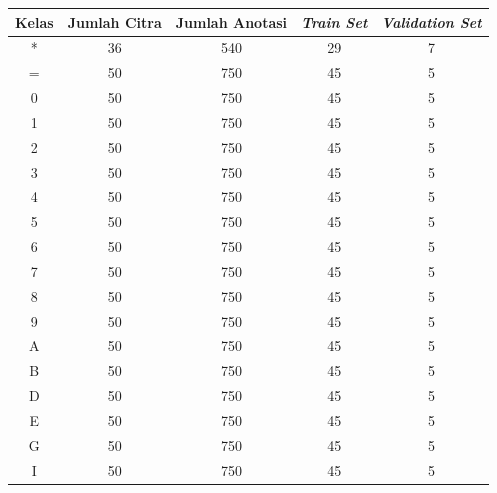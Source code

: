 \begin{center}
  \begin{longtable}[c]{|c|c|c|c|c|}
    \hline
    \textbf{Kelas} & \textbf{Jumlah Citra} & \multicolumn{1}{l|}{\textbf{Jumlah Anotasi}} & \multicolumn{1}{l|}{\textit{\textbf{Train Set}}} & \multicolumn{1}{l|}{\textit{\textbf{Validation Set}}} \\ \hline
    \endfirsthead
    \endhead
    *              & 36           & 540         & 29         & 7         \\ \hline
    =              & 50           & 750         & 45         & 5         \\ \hline
    0              & 50           & 750         & 45         & 5         \\ \hline
    1              & 50           & 750         & 45         & 5         \\ \hline
    2              & 50           & 750         & 45         & 5         \\ \hline
    3              & 50           & 750         & 45         & 5         \\ \hline
    4              & 50           & 750         & 45         & 5         \\ \hline
    5              & 50           & 750         & 45         & 5         \\ \hline
    6              & 50           & 750         & 45         & 5         \\ \hline
    7              & 50           & 750         & 45         & 5         \\ \hline
    8              & 50           & 750         & 45         & 5         \\ \hline
    9              & 50           & 750         & 45         & 5         \\ \hline
    A              & 50           & 750         & 45         & 5         \\ \hline
    B              & 50           & 750         & 45         & 5         \\ \hline
    D              & 50           & 750         & 45         & 5         \\ \hline
    E              & 50           & 750         & 45         & 5         \\ \hline
    G              & 50           & 750         & 45         & 5         \\ \hline
    I              & 50           & 750         & 45         & 5         \\ \hline

\end{longtable}
\end{center}
